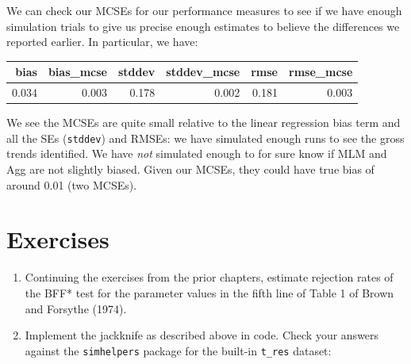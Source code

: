 \documentclass[
]{book}
\newenvironment{Shaded}{\begin{snugshade}}{\end{snugshade}}
\newcommand{\AttributeTok}[1]{\textcolor[rgb]{0.13,0.29,0.53}{#1}}
\newcommand{\DecValTok}[1]{\textcolor[rgb]{0.00,0.00,0.81}{#1}}
\newcommand{\FunctionTok}[1]{\textcolor[rgb]{0.13,0.29,0.53}{\textbf{#1}}}
\newcommand{\NormalTok}[1]{#1}
\newcommand{\OtherTok}[1]{\textcolor[rgb]{0.56,0.35,0.01}{#1}}
\newcommand{\SpecialCharTok}[1]{\textcolor[rgb]{0.81,0.36,0.00}{\textbf{#1}}}
\newcommand{\StringTok}[1]{\textcolor[rgb]{0.31,0.60,0.02}{#1}}
\begin{document}
We can check our MCSEs for our performance measures to see if we have enough simulation trials to give us precise enough estimates to believe the differences we reported earlier.
In particular, we have:

\begin{Shaded}
\end{Shaded}

\begin{tabular}{r|r|r|r|r|r}
\hline
bias & bias\_mcse & stddev & stddev\_mcse & rmse & rmse\_mcse\\
\hline
0.034 & 0.003 & 0.178 & 0.002 & 0.181 & 0.003\\
\hline
\end{tabular}

We see the MCSEs are quite small relative to the linear regression bias term and all the SEs (\texttt{stddev}) and RMSEs: we have simulated enough runs to see the gross trends identified.
We have \emph{not} simulated enough to for sure know if MLM and Agg are not slightly biased. Given our MCSEs, they could have true bias of around 0.01 (two MCSEs).

\section{Exercises}\label{exercises-5}

\begin{enumerate}
\def\labelenumi{\arabic{enumi}.}
\item
  Continuing the exercises from the prior chapters, estimate rejection rates of the BFF* test for the parameter values in the fifth line of Table 1 of Brown and Forsythe (1974).
\item
  Implement the jackknife as described above in code. Check your answers against the \texttt{simhelpers} package for the built-in \texttt{t\_res} dataset:
\end{enumerate}
\end{document}
